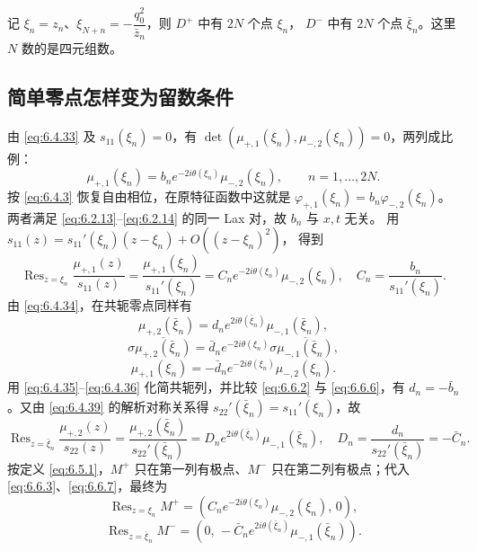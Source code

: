 \documentclass[lang=cn,scheme=chinese,mode=simple,device=normal,color=blue,
math=cm,thmcnt=section,12pt]{elegantbook}
\DeclareMathOperator*{\Res}{Res}
\newcommand{\conj}[1]{\overline{#1}}
\newcommand{\eqq}[2]{\tag{#1}\label{eq:#1}#2}
\begin{document}
记 $\xi_n=z_n$、$\xi_{N+n}=-\dfrac{q_0^2}{\bar z_n}$，则 $D^+$ 中有 $2N$ 个点 $\xi_n$，
$D^-$ 中有 $2N$ 个点 $\bar\xi_n$。这里 $N$ 数的是四元组数。


\subsection{简单零点怎样变为留数条件}
由 \eqref{eq:6.4.33} 及 $s_{11}(\xi_n)=0$，有 $\det(\mu_{+,1}(\xi_n),\mu_{-,2}(\xi_n))=0$，两列成比例：
\begin{equation}\eqq{6.6.2}{\mu_{+,1}(\xi_n)=b_ne^{-2i\theta(\xi_n)}\mu_{-,2}(\xi_n),\qquad n=1,\ldots,2N.}\end{equation}
按 \eqref{eq:6.4.3} 恢复自由相位，在原特征函数中这就是 $\varphi_{+,1}(\xi_n)=b_n\varphi_{-,2}(\xi_n)$。
两者满足 \eqref{eq:6.2.13}--\eqref{eq:6.2.14} 的同一 Lax 对，故 $b_n$ 与 $x,t$ 无关。
用 $s_{11}(z)=s_{11}'(\xi_n)(z-\xi_n)+O((z-\xi_n)^2)$，
得到
\begin{equation}\eqq{6.6.3}{\Res_{z=\xi_n}\dfrac{\mu_{+,1}(z)}{s_{11}(z)}
        =\dfrac{\mu_{+,1}(\xi_n)}{s_{11}'(\xi_n)}
        =C_ne^{-2i\theta(\xi_n)}\mu_{-,2}(\xi_n),\quad C_n=\dfrac{b_n}{s_{11}'(\xi_n)}.}\end{equation}
由 \eqref{eq:6.4.34}，在共轭零点同样有
\begin{equation}\eqq{6.6.4}{\mu_{+,2}(\bar\xi_n)=d_ne^{2i\theta(\bar\xi_n)}\mu_{-,1}(\bar\xi_n),}\end{equation}
\begin{equation}\eqq{6.6.5}{\sigma\conj{\mu_{+,2}(\bar\xi_n)}
        =\bar d_ne^{-2i\theta(\xi_n)}\sigma\conj{\mu_{-,1}(\bar\xi_n)},}\end{equation}
\begin{equation}\eqq{6.6.6}{\mu_{+,1}(\xi_n)=-\bar d_ne^{-2i\theta(\xi_n)}\mu_{-,2}(\xi_n).}\end{equation}
用 \eqref{eq:6.4.35}--\eqref{eq:6.4.36} 化简共轭列，并比较 \eqref{eq:6.6.2} 与 \eqref{eq:6.6.6}，有 $d_n=-\bar b_n$。又由 \eqref{eq:6.4.39} 的解析对称关系得 $s_{22}'(\bar\xi_n)=\conj{s_{11}'(\xi_n)}$，故
\begin{equation}\eqq{6.6.7}{\Res_{z=\bar\xi_n}\dfrac{\mu_{+,2}(z)}{s_{22}(z)}
        =\dfrac{\mu_{+,2}(\bar\xi_n)}{s_{22}'(\bar\xi_n)}
        =D_ne^{2i\theta(\bar\xi_n)}\mu_{-,1}(\bar\xi_n),\quad
        D_n=\dfrac{d_n}{s_{22}'(\bar\xi_n)}=-\bar C_n.}\end{equation}
按定义 \eqref{eq:6.5.1}，$M^+$ 只在第一列有极点、$M^-$ 只在第二列有极点；代入 \eqref{eq:6.6.3}、\eqref{eq:6.6.7}，最终为
\begin{equation}\eqq{6.6.8}{\Res_{z=\xi_n}M^+=(C_ne^{-2i\theta(\xi_n)}\mu_{-,2}(\xi_n),\,0),}\end{equation}
\begin{equation}\eqq{6.6.9}{\Res_{z=\bar\xi_n}M^-=(0,\,-\bar C_ne^{2i\theta(\bar\xi_n)}\mu_{-,1}(\bar\xi_n)).}\end{equation}
\end{document}
